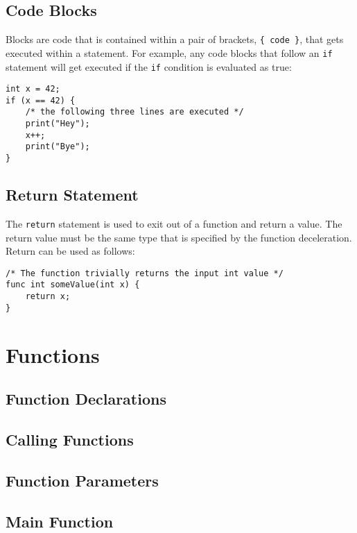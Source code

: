 \documentclass{article}
\begin{document}
\subsection{Code Blocks}
Blocks are code that is contained within a pair of brackets, \texttt{\{ code \}}, that gets executed within a statement.  For example, any code blocks that follow an \texttt{if} statement will get executed if the \texttt{if} condition is evaluated as true:

\begin{lstlisting}
int x = 42;
if (x == 42) {
	/* the following three lines are executed */
	print("Hey");
	x++;
	print("Bye");
}
\end{lstlisting}

\subsection{Return Statement}
The \texttt{return} statement is used to exit out of a function and return a value.  The return value must be the same type that is specified by the function deceleration.  Return can be used as follows:

\begin{lstlisting}
/* The function trivially returns the input int value */
func int someValue(int x) {
	return x;
}
\end{lstlisting}

\section{Functions}

\subsection{Function Declarations}

\subsection{Calling Functions}

\subsection{Function Parameters}

\subsection{Main Function}
\end{document}
